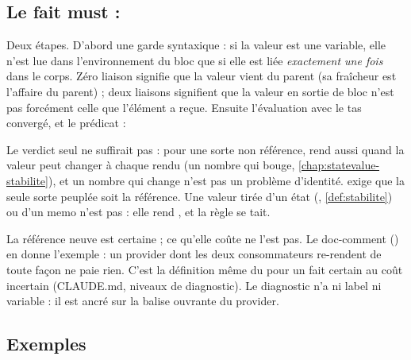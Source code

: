 \subsection{Le fait must : }


Deux étapes. D'abord une garde syntaxique : si la valeur est une variable, elle n'est lue dans l'environnement du bloc que si elle est liée \emph{exactement une fois} dans le corps. Zéro liaison signifie que la valeur vient du parent (sa fraîcheur est l'affaire du parent) ; deux liaisons signifient que la valeur en sortie de bloc n'est pas forcément celle que l'élément a reçue. Ensuite l'évaluation avec le tas convergé, et le prédicat :


Le verdict  seul ne suffirait pas : pour une sorte non référence,  rend aussi  quand la valeur \og peut changer à chaque rendu\fg{} (un nombre qui bouge, \cref{chap:statevalue-stabilite}), et un nombre qui change n'est pas un problème d'identité.  exige que la seule sorte peuplée soit la référence. Une valeur tirée d'un état (, \cref{def:stabilite}) ou d'un memo n'est pas  : elle rend , et la règle se tait.


\begin{decision}
La référence neuve est certaine ; ce qu'elle coûte ne l'est pas. Le doc-comment () en donne l'exemple : un provider dont les deux consommateurs re-rendent de toute façon ne paie rien. C'est la définition même du \Warning{} pour \og un fait certain au coût incertain\fg{} (CLAUDE.md, niveaux de diagnostic). Le diagnostic n'a ni label ni variable : il est ancré sur la balise ouvrante du provider.
\end{decision}

\subsection{Exemples}

